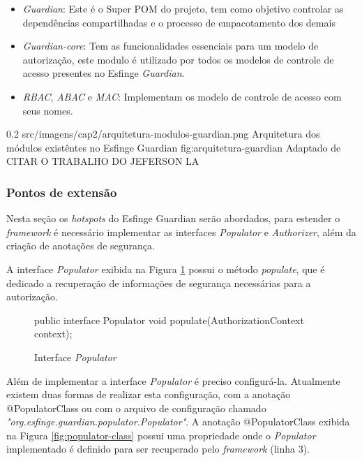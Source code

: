 \begin{itemize}
    \item \textit{Guardian}: Este é o Super POM  do projeto, tem como objetivo controlar as dependências compartilhadas e o processo de empacotamento dos demais
    
    \item \textit{Guardian-core}: Tem as funcionalidades essenciais para um modelo de autorização, este modulo é utilizado por todos os modelos de controle de acesso presentes no Esfinge \textit{Guardian}.
    
    \item \textit{RBAC}, \textit{ABAC} e \textit{MAC}: Implementam os modelo de controle de acesso com seus nomes.
 
\end{itemize}

\begin{image}
{0.2} %
{src/imagens/cap2/arquitetura-modulos-guardian.png} %
{Arquitetura dos módulos existêntes no Esfinge Guardian} %
{fig:arquitetura-guardian} %
{Adaptado de CITAR O TRABALHO DO JEFERSON LA} %
\end{image}

\subsubsection{Pontos de extensão}

\par Nesta seção os \textit{hotspots} do Esfinge Guardian serão abordados, para estender o \textit{framework} é necessário implementar as interfaces \textit{Populator} e \textit{Authorizer}, além da criação de anotações de segurança.

\par A interface \textit{Populator} exibida na Figura \ref{fig:interface-populator} possui o método \textit{populate}, que é dedicado a recuperação de informações de segurança necessárias para a autorização. 

\begin{figure}[H]
    \centering
    \caption{Interface \textit{Populator}}
    \begin{java}
public interface Populator {
	void populate(AuthorizationContext context);
}
    \end{java}
    \label{fig:interface-populator}
\end{figure}

\par Além de implementar a interface \textit{Populator} é preciso configurá-la. Atualmente existem duas formas de realizar esta configuração, com a anotação @PopulatorClass ou com o arquivo de configuração chamado \textit{"org.esfinge.guardian.populator.Populator"}. A anotação @PopulatorClass exibida na Figura \ref{fig:populator-class} possui uma propriedade onde o \textit{Populator} implementado é definido para ser recuperado pelo \textit{framework} (linha 3).

